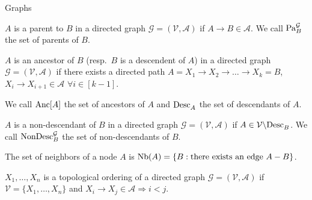 \begin{frame}{Graphs}
\begin{definition}[Parents]
$A$ is a parent to $B$ in a directed graph $\mathcal{G}=(\mathcal{V},\mathcal{A})$ if $A \rightarrow B \in \mathcal{A}$.
We call $\text{Pa}^{\mathcal{G}}_{B}$ the set of parents of $B$.
\end{definition}
%
\begin{definition}
$A$ is an ancestor of $B$ (resp.\ $B$ is a descendent of $A$) in a directed graph $\mathcal{G}=(\mathcal{V}, \mathcal{A})$ if there exists a directed path $A = X_1 \rightarrow X_2 \rightarrow \ldots \rightarrow X_k = B$, $X_i \rightarrow X_{i+1} \in \mathcal{A}$ $\forall i \in [k-1]$.

We call $\text{Anc}[A]$ the set of ancestors of $A$
and $\Desc{A}$ the set of descendants of $A$.
\end{definition}
%
\begin{definition}
$A$ is a non-descendant of $B$ in a directed graph $\mathcal{G}=(\mathcal{V}, \mathcal{A})$ if $A \in \mathcal{V} \backslash \Desc{B}$. 
We call $\text{NonDesc}^{\mathcal{G}}_{B}$ the set of non-descendants of $B$.
\end{definition}
%
\begin{definition}[Neighbors]
    The set of neighbors of a node $A$ is $\text{Nb}(A) = \{B : \text{there exists an edge } A-B\}$.
\end{definition}
\begin{definition}
$X_1,\ldots,X_n$ is a topological ordering of a directed graph $\mathcal{G}=(\mathcal{V},\mathcal{A})$ if $\mathcal{V} = \{X_1,\ldots,X_n\}$ and $X_i \rightarrow X_j \in \mathcal{A} \Rightarrow i < j$.
\end{definition}
\end{frame}

